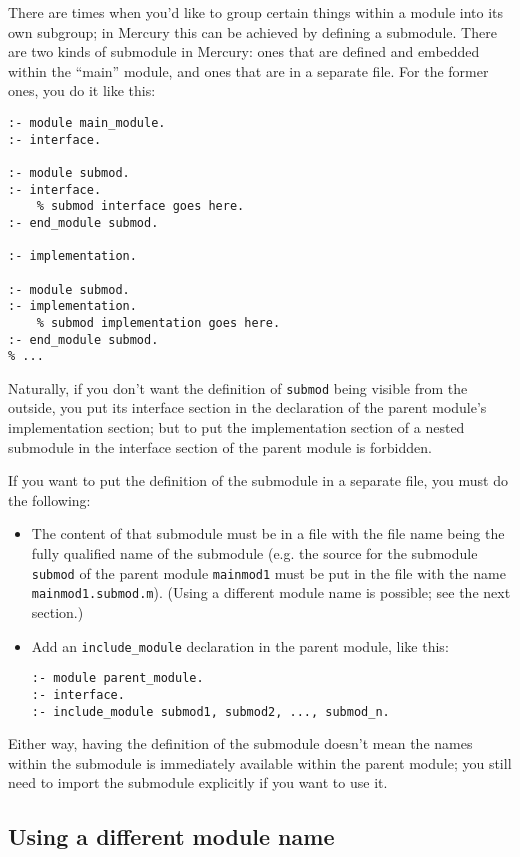 There are times when you'd like to group certain things within a module into its own subgroup; in Mercury this can be achieved by defining a submodule. There are two kinds of submodule in Mercury: ones that are defined and embedded within the ``main'' module, and ones that are in a separate file. For the former ones, you do it like this:

\begin{lstlisting}[language=Mercury]
:- module main_module.
:- interface.

:- module submod.
:- interface.
    % submod interface goes here.
:- end_module submod.

:- implementation.

:- module submod.
:- implementation.
    % submod implementation goes here.
:- end_module submod.
% ...
\end{lstlisting}

Naturally, if you don't want the definition of \texttt{submod} being visible from the outside, you put its interface section in the declaration of the parent module's implementation section; but to put the implementation section of a nested submodule in the interface section of the parent module is forbidden.

If you want to put the definition of the submodule in a separate file, you must do the following:

\begin{itemize}
\item The content of that submodule must be in a file with the file name being the fully qualified name of the submodule (e.g. the source for the submodule \texttt{submod} of the parent module \texttt{mainmod1} must be put in the file with the name \texttt{mainmod1.submod.m}). (Using a different module name is possible; see the next section.)
\item Add an \texttt{include\_module} declaration in the parent module, like this:
\begin{lstlisting}[language=Mercury]
:- module parent_module.
:- interface.
:- include_module submod1, submod2, ..., submod_n.
\end{lstlisting}
\end{itemize}

Either way, having the definition of the submodule doesn't mean the names within the submodule is immediately available within the parent module; you still need to import the submodule explicitly if you want to use it.


\subsection{Using a different module name}

